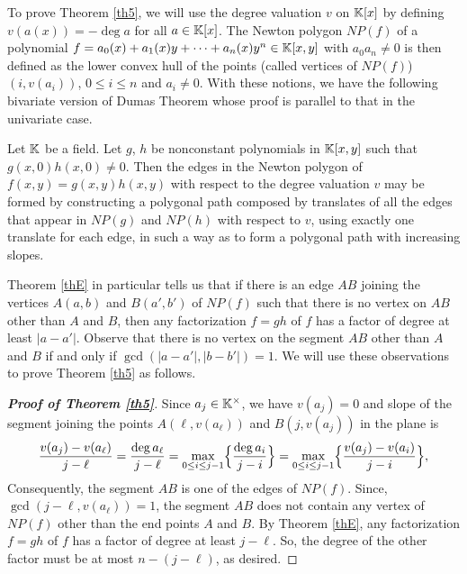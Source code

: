 \documentclass[12pt,reqno]{amsart}%
\begin{document}
To prove Theorem \ref{th5}, we will use the degree valuation $v$ on $\mathbb{K}[x]$ by defining $v(a(x))=-\deg a$ for all $a\in \mathbb{K}[x]$.  The Newton polygon $NP(f)$ of a polynomial $f=a_0(x)+a_1(x)y+\cdots+a_n(x)y^n\in \mathbb{K}[x,y]$ with $a_0a_n\neq 0$ is then defined as the lower convex hull of the points (called vertices of $NP(f)$) $(i,v(a_i))$, $0\leq i\leq n$ and $a_i\neq 0$. With these notions, we have the following bivariate version of Dumas Theorem \cite{Du} whose proof is parallel to that in the univariate case.
\begin{thmx}[Dumas]\label{thE}
Let $\mathbb{K}$ be a field. Let $g$, $h$ be nonconstant polynomials in $\mathbb{K}[x,y]$ such that $g(x,0)h(x,0)\neq 0$. Then the edges in the Newton polygon of $f(x,y)=g(x,y)h(x,y)$ with respect to the degree valuation $v$ may be formed by constructing a polygonal path composed by translates of all the edges that appear
in $NP(g)$ and $NP(h)$ with respect to $v$, using
exactly one translate for each edge, in such a way as to form a
polygonal path with increasing slopes.
\end{thmx}
Theorem \ref{thE} in particular tells us that if there is an edge $AB$ joining the vertices $A(a,b)$ and $B(a',b')$ of $NP(f)$ such that there is no vertex on $AB$ other than $A$ and $B$, then any factorization $f=gh$ of $f$ has a factor of degree at least $|a-a'|$. Observe that there is no vertex on the segment $AB$ other than $A$ and $B$ if and only if $\gcd(|a-a'|,|b-b'|)=1$. We will use these observations to prove Theorem \ref{th5} as follows.
\begin{proof}[\bf Proof of Theorem \ref{th5}]
Since $a_j\in \mathbb{K}^\times$, we have $v(a_j)=0$ and slope of the segment joining the points $A(\ell,v(a_\ell))$ and $B(j,v(a_j))$ in the plane is
\begin{eqnarray*}
\frac{v(a_j)-v(a_\ell)}{j-\ell}=\frac{\deg a_\ell}{j-\ell}=\max_{0\leq i\leq j-1}\Bigl\{\frac{\deg a_i}{j-i}\Bigr\}=\max_{0\leq i\leq j-1}\Bigl\{\frac{v(a_j)-v(a_i)}{j-i}\Bigr\},
\end{eqnarray*}
Consequently, the segment $AB$ is one of the edges of $NP(f)$. Since, $\gcd(j-\ell,v(a_\ell))=1$, the segment $AB$ does not contain any vertex of $NP(f)$ other than the end points $A$ and $B$. By Theorem \ref{thE}, any factorization $f=gh$ of $f$ has a factor of degree at least $j-\ell$. So, the degree of the other factor must be at most $n-(j-\ell)$, as desired.
\end{proof}
\end{document}
